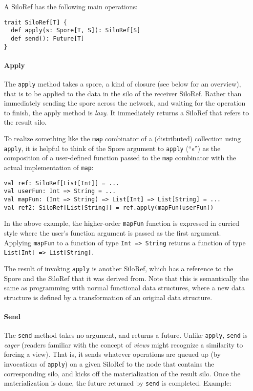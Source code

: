 \documentclass{easychair}
\begin{document}
A SiloRef has the following main operations:
\begin{verbatim}
trait SiloRef[T] {
  def apply(s: Spore[T, S]): SiloRef[S]
  def send(): Future[T]
}
\end{verbatim}

\paragraph{Apply}

The \verb|apply| method takes a spore, a kind of closure (see below for an overview), that is to be applied to
the data in the silo of the receiver SiloRef. Rather than immediately sending
the spore across the network, and waiting for the operation to finish, the
apply method is \emph{lazy}. It immediately returns a SiloRef that refers to the
result silo.

To realize something like the \verb|map| combinator of a (distributed) collection using \verb|apply|,
it is helpful to think of the Spore argument to \verb|apply| (``s'') as the composition of a
user-defined function passed to the \verb|map| combinator with the actual implementation of \verb|map|:

\begin{verbatim}
val ref: SiloRef[List[Int]] = ...
val userFun: Int => String = ...
val mapFun: (Int => String) => List[Int] => List[String] = ...
val ref2: SiloRef[List[String]] = ref.apply(mapFun(userFun))
\end{verbatim}

In the above example, the higher-order \verb|mapFun| function is expressed in curried
style where the user's function argument is passed as the first argument.
Applying \verb|mapFun| to a function of type \verb|Int => String| returns a function of type
\verb|List[Int] => List[String]|.

The result of invoking \verb|apply| is another SiloRef, which has a reference to the
Spore and the SiloRef that it was derived from. Note that this is semantically
the same as programming with normal functional data structures, where a new
data structure is defined by a transformation of an original data structure.

\paragraph{Send}

The \verb|send| method takes no argument, and returns a future. Unlike
\verb|apply|, \verb|send| is \emph{eager} (readers familiar with the concept
of \emph{views} might recognize a similarity to forcing a view). That is, it
sends whatever operations are queued up (by invocations of \verb|apply|) on a
given SiloRef to the node that contains the corresponding silo, and kicks off
the materialization of the result silo. Once the materialization is done, the
future returned by \verb|send| is completed. Example:
\end{document}
